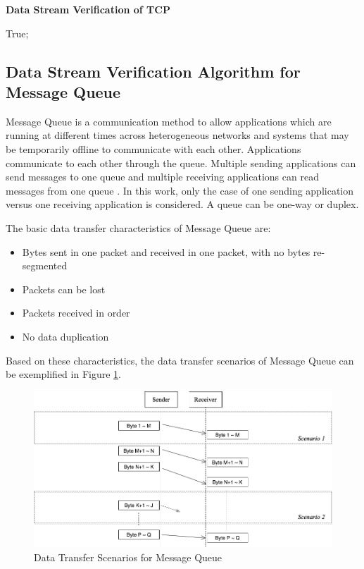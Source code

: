 \begin{algorithm}[H]
\DontPrintSemicolon
\caption{{\bf Data Stream Verification of TCP} \label{dataAlg2}}
\;
 \KwRet True;\;
\end{algorithm} 



\subsection{Data Stream Verification Algorithm for Message Queue}
Message Queue is a communication method to allow applications which are running at different times across heterogeneous networks and systems that may be temporarily offline to communicate with each other. Applications communicate to each other through the queue. Multiple sending applications can send messages to one queue and multiple receiving applications can read messages from one queue \cite{redkar2004pro}. In this work, only the case of one sending application versus one receiving application is considered. A queue can be one-way or duplex.

The basic data transfer characteristics of Message Queue are:
\begin{itemize}
  \item Bytes sent in one packet and received in one packet, with no bytes re-segmented
  \item Packets can be lost
  \item Packets received in order
  \item No data duplication
\end{itemize}
Based on these characteristics, the data transfer scenarios of Message Queue can be exemplified in Figure \ref{msmq}.
\begin{figure}[H]
\centerline{\includegraphics[scale=0.4]{Figures/msmq}}
\caption{Data Transfer Scenarios for Message Queue}
\label{msmq}
\end{figure}

